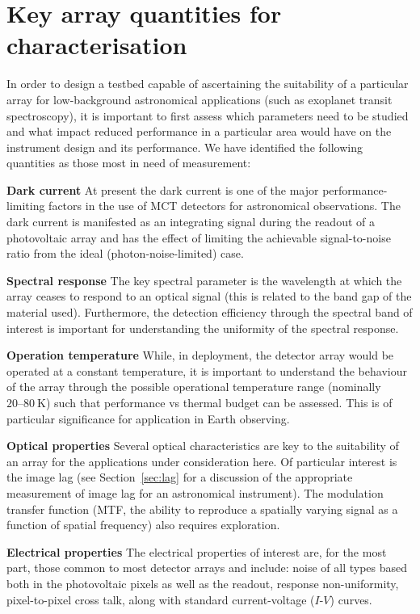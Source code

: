 \documentclass{spie}
\begin{document}
\section{Key array quantities for characterisation}
In order to design a testbed capable of ascertaining the suitability of a particular array for low-background astronomical applications (such as exoplanet transit spectroscopy), it is important to first assess which parameters need to be studied and what impact reduced performance in a particular area would have on the instrument design and its performance. We have identified the following quantities as those most in need of measurement:
\begin{description}
\item \textbf{Dark current} At present the dark current is one of the major performance-limiting factors in the use of MCT detectors for astronomical observations. The dark current is manifested as an integrating signal during the readout of a photovoltaic array and has the effect of limiting the achievable signal-to-noise ratio from the ideal (photon-noise-limited) case.
\item \textbf{Spectral response} The key spectral parameter is the wavelength at which the array ceases to respond to an optical signal (this is related to the band gap of the material used). Furthermore, the detection efficiency through the spectral band of interest is important for understanding the uniformity of the spectral response.
\item \textbf{Operation temperature} While, in deployment, the detector array would be operated at a constant temperature, it is important to understand the behaviour of the array through the possible operational temperature range (nominally $20\mbox{--}80~\si{\kelvin}$) such that performance vs thermal budget can be assessed. This is of particular significance for application in Earth observing.
\item \textbf{Optical properties} Several optical characteristics are key to the suitability of an array for the applications under consideration here. Of particular interest is the image lag (see Section~\ref{sec:lag} for a discussion of the appropriate measurement of image lag for an astronomical instrument). The modulation transfer function (MTF, the ability to reproduce a spatially varying signal as a function of spatial frequency) also requires exploration.
\item \textbf{Electrical properties} The electrical properties of interest are, for the most part, those common to most detector arrays and include: noise of all types based both in the photovoltaic pixels as well as the readout, response non-uniformity, pixel-to-pixel cross talk, along with standard current-voltage ($I\mbox{-}V$) curves.
\end{description}
%
\end{document}
